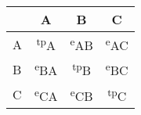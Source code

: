 \begin{center}

\begin{tabular}{| l || c | c | c | }
    \hline
        & A & B & C  \\ \hline \hline
        A & \textsuperscript{tp}A & \textsuperscript{e}AB & \textsuperscript{e}AC\\ \hline
        B & \textsuperscript{e}BA & \textsuperscript{tp}B & \textsuperscript{e}BC \\\hline
        C & \textsuperscript{e}CA & \textsuperscript{e}CB & \textsuperscript{tp}C \\\hline
    \end{tabular}

\end{center}
